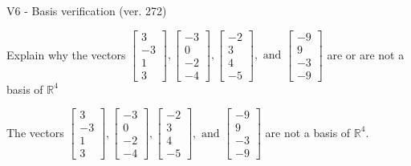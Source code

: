 \begin{exercise}
  \begin{exerciseTitle}V6 - Basis verification (ver. 272)\end{exerciseTitle}
  \begin{exerciseStatement}
    Explain why the vectors \(\left[\begin{array}{r}
3 \\
-3 \\
1 \\
3
\end{array}\right] , \left[\begin{array}{r}
-3 \\
0 \\
-2 \\
-4
\end{array}\right] , \left[\begin{array}{r}
-2 \\
3 \\
4 \\
-5
\end{array}\right] , \text{ and } \left[\begin{array}{r}
-9 \\
9 \\
-3 \\
-9
\end{array}\right]\) are or are not a basis of \(\mathbb{R}^4\)	


  \end{exerciseStatement}
  \begin{exerciseAnswer}
   The vectors \(\left[\begin{array}{r}
3 \\
-3 \\
1 \\
3
\end{array}\right] , \left[\begin{array}{r}
-3 \\
0 \\
-2 \\
-4
\end{array}\right] , \left[\begin{array}{r}
-2 \\
3 \\
4 \\
-5
\end{array}\right] , \text{ and } \left[\begin{array}{r}
-9 \\
9 \\
-3 \\
-9
\end{array}\right]\) 
  	 are not  a basis of \(\mathbb{R}^4\).
  


  \end{exerciseAnswer}
\end{exercise}